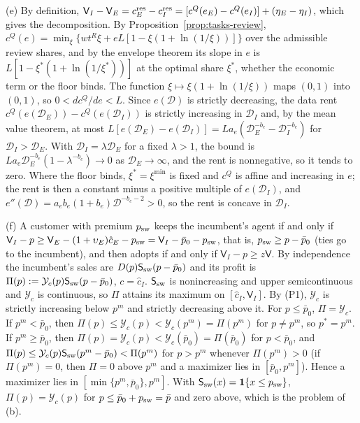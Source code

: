 (e) By definition, $\mathsf V_I-\mathsf V_E=c^{\rm res}_E-c^{\rm res}_I=[c^Q(e_E)-c^Q(e_I)]+(\eta_E-\eta_I)$, which gives the decomposition. By Proposition~\ref{prop:tasks-review}, $c^Q(e)=\min_{\xi}\{wt^R\xi+eL[1-\xi(1+\ln(1/\xi))]\}$ over the admissible review shares, and by the envelope theorem its slope in $e$ is $L[1-\xi^*(1+\ln(1/\xi^*))]$ at the optimal share $\xi^*$, whether the economic term or the floor binds. The function $\xi\mapsto\xi(1+\ln(1/\xi))$ maps $(0,1)$ into $(0,1)$, so $0<dc^Q/de<L$. Since $e(\mathcal D)$ is strictly decreasing, the data rent $c^Q(e(\mathcal D_E))-c^Q(e(\mathcal D_I))$ is strictly increasing in $\mathcal D_I$ and, by the mean value theorem, at most $L[e(\mathcal D_E)-e(\mathcal D_I)]=La_e(\mathcal D_E^{-b_e}-\mathcal D_I^{-b_e})$ for $\mathcal D_I>\mathcal D_E$. With $\mathcal D_I=\lambda\mathcal D_E$ for a fixed $\lambda>1$, the bound is $La_e\mathcal D_E^{-b_e}(1-\lambda^{-b_e})\to 0$ as $\mathcal D_E\to\infty$, and the rent is nonnegative, so it tends to zero. Where the floor binds, $\xi^*=\xi^{\min}$ is fixed and $c^Q$ is affine and increasing in $e$; the rent is then a constant minus a positive multiple of $e(\mathcal D_I)$, and $e''(\mathcal D)=a_eb_e(1+b_e)\mathcal D^{-b_e-2}>0$, so the rent is concave in $\mathcal D_I$.

(f) A customer with premium $p_{\rm sw}$ keeps the incumbent's agent if and only if $\mathsf V_I-p\ge\mathsf V_E-(1+\upsilon_E)\hat c_E-p_{\rm sw}=\mathsf V_I-\bar p_0-p_{\rm sw}$, that is, $p_{\rm sw}\ge p-\bar p_0$ (ties go to the incumbent), and then adopts if and only if $\mathsf V_I-p\ge z\mathsf V$. By independence the incumbent's sales are $D(p)\mathsf S_{\rm sw}(p-\bar p_0)$ and its profit is $\Pi(p):=\mathcal Y_c(p)\mathsf S_{\rm sw}(p-\bar p_0)$, $c=\hat c_I$. $\mathsf S_{\rm sw}$ is nonincreasing and upper semicontinuous and $\mathcal Y_c$ is continuous, so $\Pi$ attains its maximum on $[\hat c_I,\mathsf V_I]$. By (P1), $\mathcal Y_c$ is strictly increasing below $p^m$ and strictly decreasing above it. For $p\le\bar p_0$, $\Pi=\mathcal Y_c$. If $p^m<\bar p_0$, then $\Pi(p)\le\mathcal Y_c(p)<\mathcal Y_c(p^m)=\Pi(p^m)$ for $p\ne p^m$, so $p^*=p^m$. If $p^m\ge\bar p_0$, then $\Pi(p)=\mathcal Y_c(p)<\mathcal Y_c(\bar p_0)=\Pi(\bar p_0)$ for $p<\bar p_0$, and $\Pi(p)\le\mathcal Y_c(p)\mathsf S_{\rm sw}(p^m-\bar p_0)<\Pi(p^m)$ for $p>p^m$ whenever $\Pi(p^m)>0$ (if $\Pi(p^m)=0$, then $\Pi=0$ above $p^m$ and a maximizer lies in $[\bar p_0,p^m]$). Hence a maximizer lies in $[\min\{p^m,\bar p_0\},p^m]$. With $\mathsf S_{\rm sw}(x)=\mathbf 1\{x\le p_{\rm sw}\}$, $\Pi(p)=\mathcal Y_c(p)$ for $p\le\bar p_0+p_{\rm sw}=\bar p$ and zero above, which is the problem of (b).

